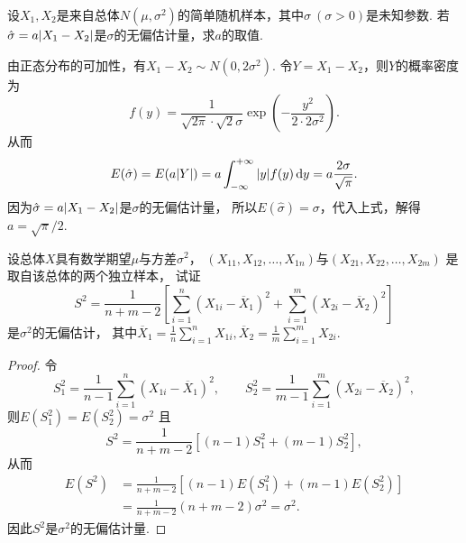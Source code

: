 \begin{example}
设\(X_1,X_2\)是来自总体\(N(\mu,\sigma^2)\)的简单随机样本，其中\(\sigma\ (\sigma>0)\)是未知参数.
若\(\hat{\sigma} = a\abs{X_1-X_2}\)是\(\sigma\)的无偏估计量，求\(a\)的取值.
\begin{solution}
由正态分布的可加性，有\(X_1-X_2 \sim N(0,2\sigma^2)\).
令\(Y = X_1-X_2\)，则\(Y\)的概率密度为\begin{equation*}
f(y) = \frac{1}{\sqrt{2\pi} \cdot \sqrt{2} \sigma} \exp(-\frac{y^2}{2 \cdot 2 \sigma^2}).
\end{equation*}从而\begin{equation*}
	E(\hat{\sigma}) = E(a \abs{Y})
	= a \int_{-\infty}^{+\infty} \abs{y} f(y) \dd{y}
	= a \frac{2 \sigma}{\sqrt{\pi}}.
\end{equation*}
因为\(\hat{\sigma} = a\abs{X_1-X_2}\)是\(\sigma\)的无偏估计量，
所以\(E(\hat{\sigma}) = \sigma\)，代入上式，解得\(a = \sqrt{\pi}/2\).
\end{solution}
\end{example}

\begin{example}
设总体\(X\)具有数学期望\(\mu\)与方差\(\sigma^2\)，
\((X_{11},X_{12},\dotsc,X_{1n})\)与\((X_{21},X_{22},\dotsc,X_{2m})\)
是取自该总体的两个独立样本，
试证\begin{equation*}
	S^2 = \frac1{n+m-2} \left[
		\sum_{i=1}^n (X_{1i}-\overline{X}_1)^2
		+ \sum_{i=1}^m (X_{2i}-\overline{X}_2)^2
	\right]
\end{equation*}是\(\sigma^2\)的无偏估计，
其中\(\overline{X}_1 = \frac1n \sum_{i=1}^n X_{1i},
\overline{X}_2 = \frac1m \sum_{i=1}^m X_{2i}\).
\begin{proof}
令\begin{equation*}
	S^2_1 = \frac1{n-1} \sum_{i=1}^n (X_{1i}-\overline{X}_1)^2, \qquad
	S^2_2 = \frac1{m-1} \sum_{i=1}^m (X_{2i}-\overline{X}_2)^2,
\end{equation*}
则\(E(S^2_1)=E(S^2_2)=\sigma^2\)
且\begin{equation*}
	S^2 = \frac1{n+m-2} \left[
		(n-1) S^2_1
		+ (m-1) S^2_2
	\right],
\end{equation*}
从而\begin{align*}
	E(S^2)
	&= \frac1{n+m-2} \left[
		(n-1) E(S^2_1)
		+ (m-1) E(S^2_2)
	\right] \\
	&= \frac1{n+m-2} (n+m-2) \sigma^2
	= \sigma^2.
\end{align*}
因此\(S^2\)是\(\sigma^2\)的无偏估计量.
\end{proof}
\end{example}

